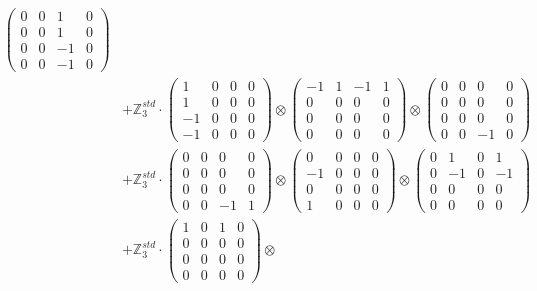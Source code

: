 \documentclass{article}
\begin{document}
{\begin{align}
            \begin{pmatrix} 0 & 0 & 1 & 0 \\ 0 & 0 & 1 & 0 \\ 0 & 0 & -1 & 0 \\ 0 & 0 & -1 & 0 \end{pmatrix} \\ 
        &+ \label{Rs1-Rc16-Solution-1-c7} \mathbb{Z}_3^{std} \cdot 
            \begin{pmatrix} 1 & 0 & 0 & 0 \\ 1 & 0 & 0 & 0 \\ -1 & 0 & 0 & 0 \\ -1 & 0 & 0 & 0 \end{pmatrix} \otimes 
            \begin{pmatrix} -1 & 1 & -1 & 1 \\ 0 & 0 & 0 & 0 \\ 0 & 0 & 0 & 0 \\ 0 & 0 & 0 & 0 \end{pmatrix} \otimes 
            \begin{pmatrix} 0 & 0 & 0 & 0 \\ 0 & 0 & 0 & 0 \\ 0 & 0 & 0 & 0 \\ 0 & 0 & -1 & 0 \end{pmatrix} \\ 
        &+ \label{Rs1-Rc16-Solution-1-c8} \mathbb{Z}_3^{std} \cdot 
            \begin{pmatrix} 0 & 0 & 0 & 0 \\ 0 & 0 & 0 & 0 \\ 0 & 0 & 0 & 0 \\ 0 & 0 & -1 & 1 \end{pmatrix} \otimes 
            \begin{pmatrix} 0 & 0 & 0 & 0 \\ -1 & 0 & 0 & 0 \\ 0 & 0 & 0 & 0 \\ 1 & 0 & 0 & 0 \end{pmatrix} \otimes 
            \begin{pmatrix} 0 & 1 & 0 & 1 \\ 0 & -1 & 0 & -1 \\ 0 & 0 & 0 & 0 \\ 0 & 0 & 0 & 0 \end{pmatrix} \\ 
        &+ \label{Rs1-Rc16-Solution-1-c9} \mathbb{Z}_3^{std} \cdot 
            \begin{pmatrix} 1 & 0 & 1 & 0 \\ 0 & 0 & 0 & 0 \\ 0 & 0 & 0 & 0 \\ 0 & 0 & 0 & 0 \end{pmatrix} \otimes 

\end{align}}
\end{document}

